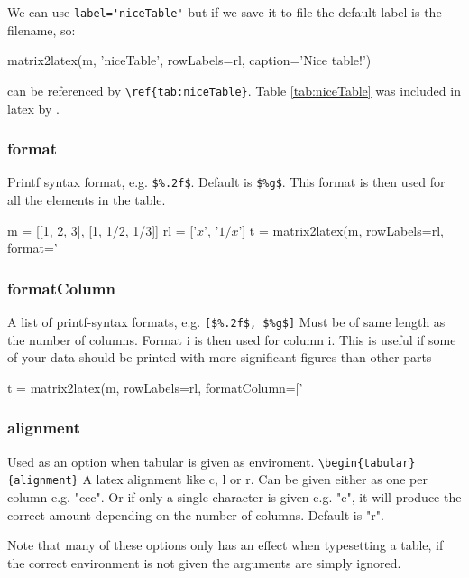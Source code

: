 We can use \lstinline{label='niceTable'} but if we save it to file
the default label is the filename, so:
\begin{sageblock}
matrix2latex(m, 'niceTable', rowLabels=rl, 
                 caption='Nice table!')
\end{sageblock}
can be referenced by \verb!\ref{tab:niceTable}!. Table \ref{tab:niceTable}
was included in latex by \verb!!.


\subsubsection{format}
Printf syntax format, e.g. \lstinline{$%.2f$}. Default is \lstinline{$%g$}.
  This format is then used for all the elements in the table.
\begin{sageblock}
m = [[1, 2, 3], [1, 1/2, 1/3]]
rl = ['$x$', '$1/x$']
t = matrix2latex(m, rowLabels=rl,
                 format='%
\end{sageblock}
  
\subsubsection{formatColumn}
A list of printf-syntax formats, e.g. \lstinline{[$%.2f$, $%g$]}
Must be of same length as the number of columns.
Format i is then used for column i.
This is useful if some of your data should be printed with more significant figures
than other parts
\begin{sageblock}
t = matrix2latex(m, rowLabels=rl,
                 formatColumn=['%
\end{sageblock}

\subsubsection{alignment}
Used as an option when tabular is given as enviroment.
\verb!\begin{tabular}{alignment}!
A latex alignment like c, l or r.
Can be given either as one per column e.g. "ccc".
Or if only a single character is given e.g. "c",
it will produce the correct amount depending on the number of columns.
Default is "r".

Note that many of these options only has an effect when typesetting a table,
if the correct environment is not given the arguments are simply ignored.

